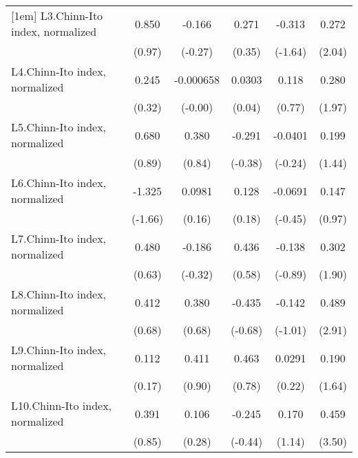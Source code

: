 {\begin{longtable}{l*{5}{c}}
[1em]
L3.Chinn-Ito index, normalized&    0.850         &   -0.166         &    0.271         &   -0.313         &    0.272\sym{*}  \\
                &   (0.97)         &  (-0.27)         &   (0.35)         &  (-1.64)         &   (2.04)         \\
[1em]
L4.Chinn-Ito index, normalized&    0.245         &-0.000658         &   0.0303         &    0.118         &    0.280         \\
                &   (0.32)         &  (-0.00)         &   (0.04)         &   (0.77)         &   (1.97)         \\
[1em]
L5.Chinn-Ito index, normalized&    0.680         &    0.380         &   -0.291         &  -0.0401         &    0.199         \\
                &   (0.89)         &   (0.84)         &  (-0.38)         &  (-0.24)         &   (1.44)         \\
[1em]
L6.Chinn-Ito index, normalized&   -1.325         &   0.0981         &    0.128         &  -0.0691         &    0.147         \\
                &  (-1.66)         &   (0.16)         &   (0.18)         &  (-0.45)         &   (0.97)         \\
[1em]
L7.Chinn-Ito index, normalized&    0.480         &   -0.186         &    0.436         &   -0.138         &    0.302         \\
                &   (0.63)         &  (-0.32)         &   (0.58)         &  (-0.89)         &   (1.90)         \\
[1em]
L8.Chinn-Ito index, normalized&    0.412         &    0.380         &   -0.435         &   -0.142         &    0.489\sym{**} \\
                &   (0.68)         &   (0.68)         &  (-0.68)         &  (-1.01)         &   (2.91)         \\
[1em]
L9.Chinn-Ito index, normalized&    0.112         &    0.411         &    0.463         &   0.0291         &    0.190         \\
                &   (0.17)         &   (0.90)         &   (0.78)         &   (0.22)         &   (1.64)         \\
[1em]
L10.Chinn-Ito index, normalized&    0.391         &    0.106         &   -0.245         &    0.170         &    0.459\sym{***}\\
                &   (0.85)         &   (0.28)         &  (-0.44)         &   (1.14)         &   (3.50)         \\

\end{longtable}}
